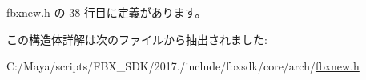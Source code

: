  fbxnew.\+h の 38 行目に定義があります。



この構造体詳解は次のファイルから抽出されました\+:\begin{DoxyCompactItemize}
\item 
C\+:/\+Maya/scripts/\+F\+B\+X\+\_\+\+S\+D\+K/2017./include/fbxsdk/core/arch/\hyperlink{fbxnew_8h}{fbxnew.\+h}\end{DoxyCompactItemize}
